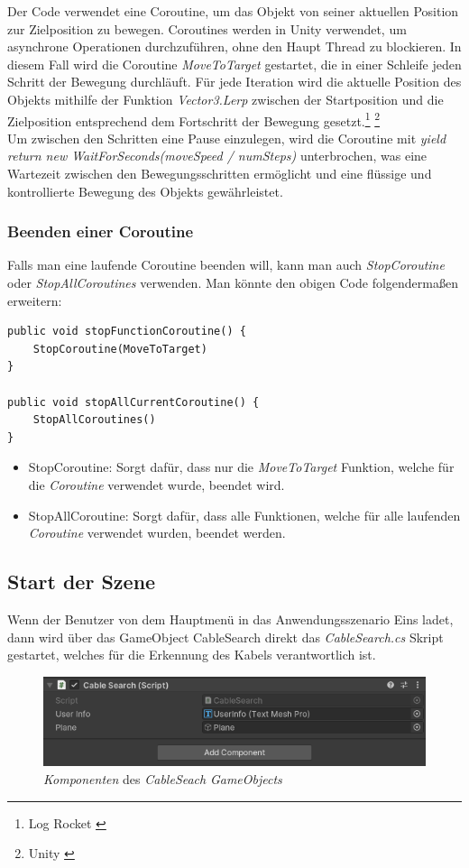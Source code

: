 Der Code verwendet eine Coroutine, um das Objekt von seiner aktuellen Position zur Zielposition zu bewegen. Coroutines werden in Unity verwendet, um asynchrone Operationen durchzuführen, ohne den Haupt Thread zu blockieren. In diesem Fall wird die Coroutine \textit{MoveToTarget} gestartet, die in einer Schleife jeden Schritt der Bewegung durchläuft. Für jede Iteration wird die aktuelle Position des Objekts mithilfe der Funktion \textit{Vector3.Lerp} zwischen der Startposition und die Zielposition entsprechend dem Fortschritt der Bewegung gesetzt.\protect\footnote{Log Rocket \cite{Coroutine2}} \footnote{ Unity \cite{Coroutine}}\\

Um zwischen den Schritten eine Pause einzulegen, wird die Coroutine mit \textit{yield return new WaitForSeconds(moveSpeed / numSteps)} unterbrochen, was eine Wartezeit zwischen den Bewegungsschritten ermöglicht und eine flüssige und kontrollierte Bewegung des Objekts gewährleistet.
\\
\subsubsection*{Beenden einer Coroutine}
Falls man eine laufende Coroutine beenden will, kann man auch \textit{StopCoroutine} oder \textit{StopAllCoroutines} verwenden. Man könnte den obigen Code folgendermaßen erweitern:
\begin{lstlisting}[style=csharp, caption={Coroutine beenden}, label=code:debugRaycast]
public void stopFunctionCoroutine() {
    StopCoroutine(MoveToTarget)
}

public void stopAllCurrentCoroutine() {
    StopAllCoroutines()
}
\end{lstlisting}
\begin{itemize}
    \item StopCoroutine: Sorgt dafür, dass nur die \textit{MoveToTarget} Funktion, welche für die \textit{Coroutine} verwendet wurde, beendet wird.
    \item StopAllCoroutine: Sorgt dafür, dass alle Funktionen, welche für alle laufenden \textit{Coroutine} verwendet wurden, beendet werden.
\end{itemize}


\subsection{Start der Szene}
Wenn der Benutzer von dem Hauptmenü in das Anwendungsszenario Eins ladet, dann wird über das GameObject CableSearch direkt das \textit{CableSearch.cs} Skript gestartet, welches für die Erkennung des Kabels verantwortlich ist.
\begin{figure}[H]
    \centering
    \includegraphics[scale=0.7]{images/CableSearchObjekt.png}
    \caption{\textit{Komponenten} des \textit{CableSeach} \textit{GameObjects}}
    \label{fig:CableSearchObjekt}
\end{figure}
